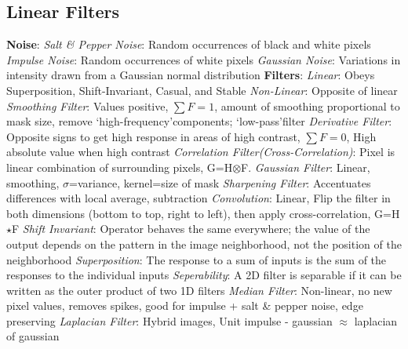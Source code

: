 \documentclass{article}
\author{Ian Chen}
\date{\today}
\begin{document}
    \begin{multicols*}{2}
        \subsection*{Linear Filters}
        \textbf{Noise}:\newline
        \textit{Salt \& Pepper Noise}: Random occurrences of black and white pixels\newline
        \textit{Impulse Noise}: Random occurrences of white pixels\newline
        \textit{Gaussian Noise}: Variations in intensity drawn from a Gaussian normal distribution\newline
        \textbf{Filters}:\newline
        \textit{Linear}: Obeys Superposition, Shift-Invariant, Casual, and Stable\newline
        \textit{Non-Linear}: Opposite of linear\newline
        \textit{Smoothing Filter}: Values positive, $\sum F=1$, amount of smoothing proportional to mask size, remove
        \textquoteleft high-frequency\textquoteright components; \textquoteleft low-pass\textquoteright filter\newline
        \textit{Derivative Filter}: Opposite signs to get high response in areas of high contrast, $\sum F=0$, High
        absolute value when high contrast\newline
        \textit{Correlation Filter(Cross-Correlation)}: Pixel is linear combination of surrounding pixels,
        G=H$\otimes$F.\newline
        \textit{Gaussian Filter}: Linear, smoothing, $\sigma$=variance, kernel=size of mask\newline
        \textit{Sharpening Filter}: Accentuates differences with local average, subtraction\newline
        \textit{Convolution}: Linear, Flip the filter in both dimensions (bottom to top, right to left), then apply
        cross-correlation, G=H$\star$F\newline
        \textit{Shift Invariant}: Operator behaves the same everywhere; the value of the output depends on the
        pattern in the image neighborhood, not the position of the neighborhood\newline
        \textit{Superposition}: The response to a sum of inputs is the sum of the responses to the individual inputs\newline
        \textit{Seperability}: A 2D filter is separable if it can be written as the outer product of two 1D filters\newline
        \textit{Median Filter}: Non-linear, no new pixel values, removes spikes, good for impulse + salt \& pepper
        noise, edge preserving\newline
        \textit{Laplacian Filter}: Hybrid images, Unit impulse - gaussian $\approx$ laplacian of gaussian\newline

\end{multicols*}
\end{document}
